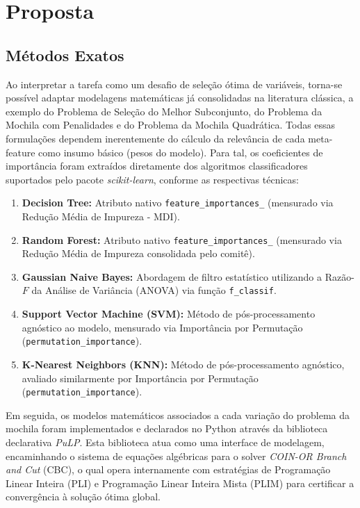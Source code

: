 \documentclass[12pt]{article}
\begin{document}
\section{Proposta}

\subsection{Métodos Exatos} \label{sub:exato}

Ao interpretar a tarefa como um desafio de seleção ótima de variáveis, torna-se possível adaptar modelagens matemáticas já consolidadas na literatura clássica, a exemplo do Problema de Seleção do Melhor Subconjunto, do Problema da Mochila com Penalidades e do Problema da Mochila Quadrática. Todas essas formulações dependem inerentemente do cálculo da relevância de cada meta-feature como insumo básico (pesos do modelo). Para tal, os coeficientes de importância foram extraídos diretamente dos algoritmos classificadores suportados pelo pacote \textit{scikit-learn}, conforme as respectivas técnicas:

\begin{enumerate}
    \item \textbf{Decision Tree:} Atributo nativo \texttt{feature\_importances\_} (mensurado via Redução Média de Impureza - MDI).
    \item \textbf{Random Forest:} Atributo nativo \texttt{feature\_importances\_} (mensurado via Redução Média de Impureza consolidada pelo comitê).
    \item \textbf{Gaussian Naive Bayes:} Abordagem de filtro estatístico utilizando a Razão-$F$ da Análise de Variância (ANOVA) via função \texttt{f\_classif}.
    \item \textbf{Support Vector Machine (SVM):} Método de pós-processamento agnóstico ao modelo, mensurado via Importância por Permutação (\texttt{permutation\_importance}).
    \item \textbf{K-Nearest Neighbors (KNN):} Método de pós-processamento agnóstico, avaliado similarmente por Importância por Permutação (\texttt{permutation\_importance}).
\end{enumerate}

Em seguida, os modelos matemáticos associados a cada variação do problema da mochila foram implementados e declarados no Python através da biblioteca declarativa \textit{PuLP}. Esta biblioteca atua como uma interface de modelagem, encaminhando o sistema de equações algébricas para o solver \textit{COIN-OR Branch and Cut} (CBC), o qual opera internamente com estratégias de Programação Linear Inteira (PLI) e Programação Linear Inteira Mista (PLIM) para certificar a convergência à solução ótima global.
\end{document}
